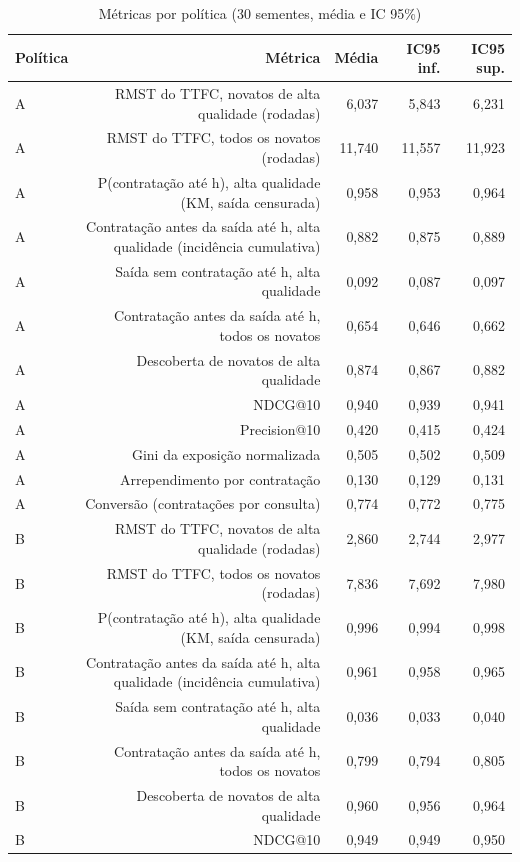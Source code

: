 \begin{table}[ht]
\centering
\caption{Métricas por política (30 sementes, média e IC 95\%)}
\label{tab:metricas_por_politica}
\begin{tabular}{lrrrr}
\hline
\textbf{Política} & \textbf{Métrica} & \textbf{Média} & \textbf{IC95 inf.} & \textbf{IC95 sup.} \\
\hline
A & RMST do TTFC, novatos de alta qualidade (rodadas) & 6,037 & 5,843 & 6,231 \\
A & RMST do TTFC, todos os novatos (rodadas) & 11,740 & 11,557 & 11,923 \\
A & P(contratação até h), alta qualidade (KM, saída censurada) & 0,958 & 0,953 & 0,964 \\
A & Contratação antes da saída até h, alta qualidade (incidência cumulativa) & 0,882 & 0,875 & 0,889 \\
A & Saída sem contratação até h, alta qualidade & 0,092 & 0,087 & 0,097 \\
A & Contratação antes da saída até h, todos os novatos & 0,654 & 0,646 & 0,662 \\
A & Descoberta de novatos de alta qualidade & 0,874 & 0,867 & 0,882 \\
A & NDCG@10 & 0,940 & 0,939 & 0,941 \\
A & Precision@10 & 0,420 & 0,415 & 0,424 \\
A & Gini da exposição normalizada & 0,505 & 0,502 & 0,509 \\
A & Arrependimento por contratação & 0,130 & 0,129 & 0,131 \\
A & Conversão (contratações por consulta) & 0,774 & 0,772 & 0,775 \\
B & RMST do TTFC, novatos de alta qualidade (rodadas) & 2,860 & 2,744 & 2,977 \\
B & RMST do TTFC, todos os novatos (rodadas) & 7,836 & 7,692 & 7,980 \\
B & P(contratação até h), alta qualidade (KM, saída censurada) & 0,996 & 0,994 & 0,998 \\
B & Contratação antes da saída até h, alta qualidade (incidência cumulativa) & 0,961 & 0,958 & 0,965 \\
B & Saída sem contratação até h, alta qualidade & 0,036 & 0,033 & 0,040 \\
B & Contratação antes da saída até h, todos os novatos & 0,799 & 0,794 & 0,805 \\
B & Descoberta de novatos de alta qualidade & 0,960 & 0,956 & 0,964 \\
B & NDCG@10 & 0,949 & 0,949 & 0,950 \\

\end{tabular}
\end{table}
